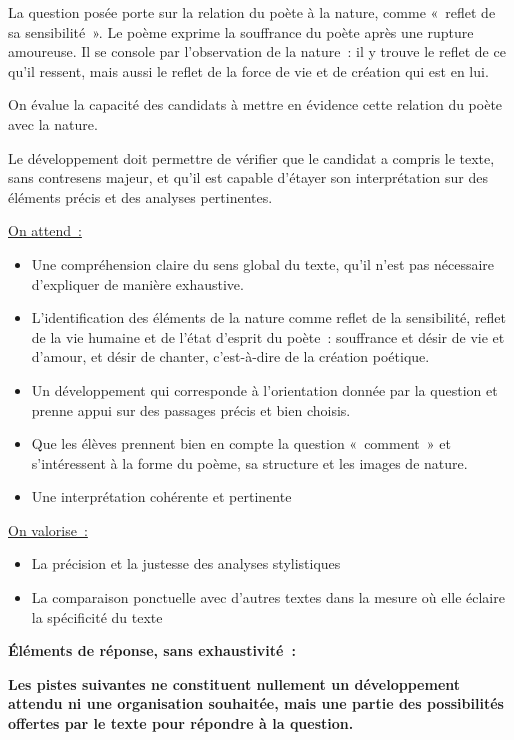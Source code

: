 {La question posée porte sur la relation du poète à la nature, comme «~reflet de sa sensibilité~». Le poème exprime la souffrance du poète après une rupture amoureuse. Il se console par
l'observation de la nature~: il y trouve le reflet de ce qu'il ressent, mais aussi le reflet de la force
de vie et de création qui est en lui.

On évalue la capacité des candidats à mettre en évidence cette relation du poète avec la nature.

Le développement doit permettre de vérifier que le candidat a compris le texte, sans contresens
majeur, et qu'il est capable d'étayer son interprétation sur des éléments précis et des analyses
pertinentes.

\underline{On attend~:}

\begin{itemize}
\item Une compréhension claire du sens global du texte, qu'il n'est pas nécessaire d'expliquer
de manière exhaustive.
\item  L'identification des éléments de la nature comme reflet de la sensibilité, reflet de la vie
humaine et de l'état d'esprit du poète~: souffrance et désir de vie et d'amour, et désir de
chanter, c'est-à-dire de la création poétique.
\item  Un développement qui corresponde à l'orientation donnée par la question et prenne appui
sur des passages précis et bien choisis.
\item  Que les élèves prennent bien en compte la question «~comment~» et s'intéressent à la
forme du poème, sa structure et les images de nature.
\item Une interprétation cohérente et pertinente
\end{itemize}

\underline{On valorise~:}

\begin{itemize}
\item La précision et la justesse des analyses stylistiques
\item La comparaison ponctuelle avec d'autres textes dans la mesure où elle éclaire la
spécificité du texte
\end{itemize}

\bigskip

\textbf{Éléments de réponse, sans exhaustivité~:}

\textbf{Les pistes suivantes ne constituent nullement un développement attendu ni une organisation
souhaitée, mais une partie des possibilités offertes par le texte pour répondre à la question.}

}
